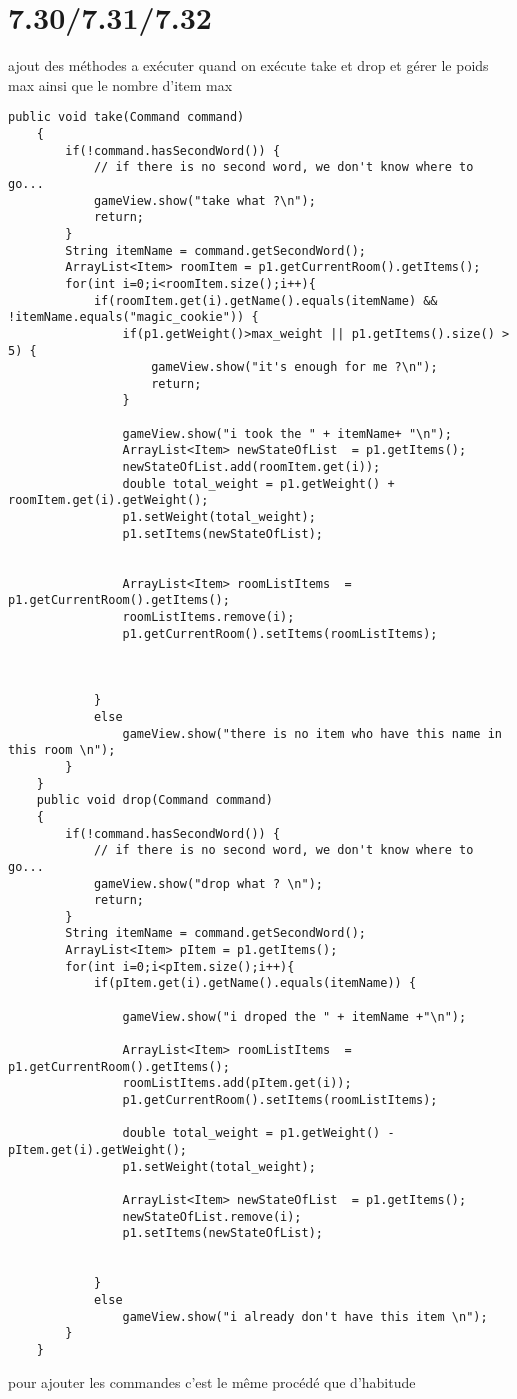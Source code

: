\documentclass[a4paper , 10pt]{article}
\begin{document}
\section{7.30/7.31/7.32}
\quad ajout des méthodes a exécuter quand on exécute take et drop et gérer le poids max ainsi que le nombre d'item max 

\begin{verbatim}
public void take(Command command)
    {
        if(!command.hasSecondWord()) {
            // if there is no second word, we don't know where to go...
            gameView.show("take what ?\n");
            return;
        }
        String itemName = command.getSecondWord();
        ArrayList<Item> roomItem = p1.getCurrentRoom().getItems();
        for(int i=0;i<roomItem.size();i++){
            if(roomItem.get(i).getName().equals(itemName) && !itemName.equals("magic_cookie")) {
                if(p1.getWeight()>max_weight || p1.getItems().size() > 5) {
                    gameView.show("it's enough for me ?\n");
                    return;
                }

                gameView.show("i took the " + itemName+ "\n");
                ArrayList<Item> newStateOfList  = p1.getItems();
                newStateOfList.add(roomItem.get(i));
                double total_weight = p1.getWeight() + roomItem.get(i).getWeight();
                p1.setWeight(total_weight);
                p1.setItems(newStateOfList);


                ArrayList<Item> roomListItems  = p1.getCurrentRoom().getItems();
                roomListItems.remove(i);
                p1.getCurrentRoom().setItems(roomListItems);



            }
            else
                gameView.show("there is no item who have this name in this room \n");
        }
    }
    public void drop(Command command)
    {
        if(!command.hasSecondWord()) {
            // if there is no second word, we don't know where to go...
            gameView.show("drop what ? \n");
            return;
        }
        String itemName = command.getSecondWord();
        ArrayList<Item> pItem = p1.getItems();
        for(int i=0;i<pItem.size();i++){
            if(pItem.get(i).getName().equals(itemName)) {

                gameView.show("i droped the " + itemName +"\n");

                ArrayList<Item> roomListItems  = p1.getCurrentRoom().getItems();
                roomListItems.add(pItem.get(i));
                p1.getCurrentRoom().setItems(roomListItems);

                double total_weight = p1.getWeight() - pItem.get(i).getWeight();
                p1.setWeight(total_weight);

                ArrayList<Item> newStateOfList  = p1.getItems();
                newStateOfList.remove(i);
                p1.setItems(newStateOfList);


            }
            else
                gameView.show("i already don't have this item \n");
        }
    }
\end{verbatim}
pour ajouter les commandes c'est le même procédé que d'habitude 
\end{document}

